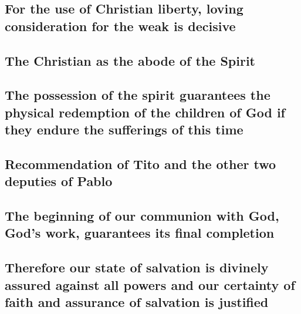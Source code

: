 \hypertarget{for-the-use-of-christian-liberty-loving-consideration-for-the-weak-is-decisive}{%
\subsection{For the use of Christian liberty, loving consideration for
the weak is
decisive}\label{for-the-use-of-christian-liberty-loving-consideration-for-the-weak-is-decisive}}

\hypertarget{the-christian-as-the-abode-of-the-spirit}{%
\subsection{The Christian as the abode of the
Spirit}\label{the-christian-as-the-abode-of-the-spirit}}

\hypertarget{the-possession-of-the-spirit-guarantees-the-physical-redemption-of-the-children-of-god-if-they-endure-the-sufferings-of-this-time}{%
\subsection{The possession of the spirit guarantees the physical
redemption of the children of God if they endure the sufferings of this
time}\label{the-possession-of-the-spirit-guarantees-the-physical-redemption-of-the-children-of-god-if-they-endure-the-sufferings-of-this-time}}

\hypertarget{recommendation-of-tito-and-the-other-two-deputies-of-pablo}{%
\subsection{Recommendation of Tito and the other two deputies of
Pablo}\label{recommendation-of-tito-and-the-other-two-deputies-of-pablo}}

\hypertarget{the-beginning-of-our-communion-with-god-gods-work-guarantees-its-final-completion}{%
\subsection{The beginning of our communion with God, God's work,
guarantees its final
completion}\label{the-beginning-of-our-communion-with-god-gods-work-guarantees-its-final-completion}}

\hypertarget{therefore-our-state-of-salvation-is-divinely-assured-against-all-powers-and-our-certainty-of-faith-and-assurance-of-salvation-is-justified}{%
\subsection{Therefore our state of salvation is divinely assured against
all powers and our certainty of faith and assurance of salvation is
justified}\label{therefore-our-state-of-salvation-is-divinely-assured-against-all-powers-and-our-certainty-of-faith-and-assurance-of-salvation-is-justified}}

